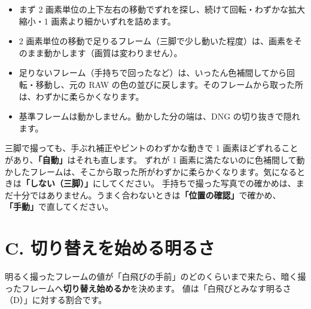 \documentclass[paper=a4paper,fontsize=11pt,report,jafontsize=11pt]{jlreq}
\newcommand{\ui}[1]{\textsf{\textbf{「#1」}}}
\begin{document}
\begin{memo}[位置合わせのしくみ]
\begin{itemize}
  \item まず 2 画素単位の上下左右の移動でずれを探し、続けて回転・わずかな拡大縮小・1 画素より細かいずれを詰めます。
  \item 2 画素単位の移動で足りるフレーム（三脚で少し動いた程度）は、画素をそのまま動かします（画質は変わりません）。
  \item 足りないフレーム（手持ちで回ったなど）は、いったん色補間してから回転・移動し、元の RAW の色の並びに戻します。そのフレームから取った所は、わずかに柔らかくなります。
  \item 基準フレームは動かしません。動かした分の端は、DNG の切り抜きで隠れます。
\end{itemize}
\end{memo}

\begin{warn}
三脚で撮っても、手ぶれ補正やピントのわずかな動きで 1 画素ほどずれることがあり、\ui{自動}はそれも直します。
ずれが 1 画素に満たないのに色補間して動かしたフレームは、そこから取った所がわずかに柔らかくなります。気になるときは\ui{しない（三脚）}にしてください。
手持ちで撮った写真での確かめは、まだ十分ではありません。うまく合わないときは\ui{位置の確認}で確かめ、\ui{手動}で直してください。
\end{warn}

\section{C. 切り替えを始める明るさ}\label{sec:ramp}
明るく撮ったフレームの値が「白飛びの手前」のどのくらいまで来たら、暗く撮ったフレームへ\textbf{切り替え始めるか}を決めます。
値は「白飛びとみなす明るさ（D）」に対する割合です。

\begin{center}
\end{center}
\end{document}
